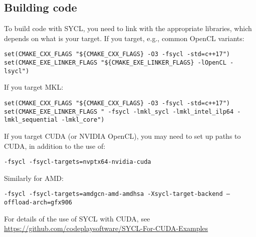 \subsection{Building code}

To build code with SYCL, you need to link with the appropriate libraries, which depends on what is your target. 
If you target, e.g., common OpenCL variants: 

\begin{verbatim}
set(CMAKE_CXX_FLAGS "${CMAKE_CXX_FLAGS} -O3 -fsycl -std=c++17")
set(CMAKE_EXE_LINKER_FLAGS "${CMAKE_EXE_LINKER_FLAGS} -lOpenCL -lsycl")
\end{verbatim}

If you target MKL:

\begin{verbatim}
set(CMAKE_CXX_FLAGS "${CMAKE_CXX_FLAGS} -O3 -fsycl -std=c++17")
set(CMAKE_EXE_LINKER_FLAGS " -fsycl -lmkl_sycl -lmkl_intel_ilp64 -lmkl_sequential -lmkl_core")
\end{verbatim}

If you target CUDA (or NVIDIA OpenCL), you may need to set up paths to CUDA, in addition to the use of:

\begin{verbatim}
-fsycl -fsycl-targets=nvptx64-nvidia-cuda
\end{verbatim}

Similarly for AMD:

\begin{verbatim}
-fsycl -fsycl-targets=amdgcn-amd-amdhsa -Xsycl-target-backend –offload-arch=gfx906
\end{verbatim}

For details of the use of SYCL with CUDA, see \url{https://github.com/codeplaysoftware/SYCL-For-CUDA-Examples}

